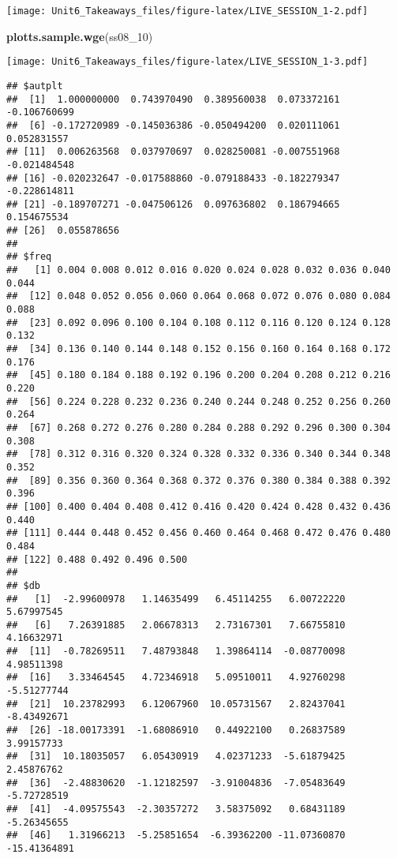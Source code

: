 \documentclass[]{article}
\newenvironment{Shaded}{\begin{snugshade}}{\end{snugshade}}
\newcommand{\DecValTok}[1]{\textcolor[rgb]{0.00,0.00,0.81}{#1}}
\newcommand{\KeywordTok}[1]{\textcolor[rgb]{0.13,0.29,0.53}{\textbf{#1}}}
\newcommand{\NormalTok}[1]{#1}
\begin{document}
\texttt{[image: Unit6\_Takeaways\_files/figure-latex/LIVE\_SESSION\_1-2.pdf]}

\begin{Shaded}
\begin{Highlighting}[]
\KeywordTok{plotts.sample.wge}\NormalTok{(ss08_}\DecValTok{10}\NormalTok{)}
\end{Highlighting}
\end{Shaded}

\texttt{[image: Unit6\_Takeaways\_files/figure-latex/LIVE\_SESSION\_1-3.pdf]}

\begin{verbatim}
## $autplt
##  [1]  1.000000000  0.743970490  0.389560038  0.073372161 -0.106760699
##  [6] -0.172720989 -0.145036386 -0.050494200  0.020111061  0.052831557
## [11]  0.006263568  0.037970697  0.028250081 -0.007551968 -0.021484548
## [16] -0.020232647 -0.017588860 -0.079188433 -0.182279347 -0.228614811
## [21] -0.189707271 -0.047506126  0.097636802  0.186794665  0.154675534
## [26]  0.055878656
## 
## $freq
##   [1] 0.004 0.008 0.012 0.016 0.020 0.024 0.028 0.032 0.036 0.040 0.044
##  [12] 0.048 0.052 0.056 0.060 0.064 0.068 0.072 0.076 0.080 0.084 0.088
##  [23] 0.092 0.096 0.100 0.104 0.108 0.112 0.116 0.120 0.124 0.128 0.132
##  [34] 0.136 0.140 0.144 0.148 0.152 0.156 0.160 0.164 0.168 0.172 0.176
##  [45] 0.180 0.184 0.188 0.192 0.196 0.200 0.204 0.208 0.212 0.216 0.220
##  [56] 0.224 0.228 0.232 0.236 0.240 0.244 0.248 0.252 0.256 0.260 0.264
##  [67] 0.268 0.272 0.276 0.280 0.284 0.288 0.292 0.296 0.300 0.304 0.308
##  [78] 0.312 0.316 0.320 0.324 0.328 0.332 0.336 0.340 0.344 0.348 0.352
##  [89] 0.356 0.360 0.364 0.368 0.372 0.376 0.380 0.384 0.388 0.392 0.396
## [100] 0.400 0.404 0.408 0.412 0.416 0.420 0.424 0.428 0.432 0.436 0.440
## [111] 0.444 0.448 0.452 0.456 0.460 0.464 0.468 0.472 0.476 0.480 0.484
## [122] 0.488 0.492 0.496 0.500
## 
## $db
##   [1]  -2.99600978   1.14635499   6.45114255   6.00722220   5.67997545
##   [6]   7.26391885   2.06678313   2.73167301   7.66755810   4.16632971
##  [11]  -0.78269511   7.48793848   1.39864114  -0.08770098   4.98511398
##  [16]   3.33464545   4.72346918   5.09510011   4.92760298  -5.51277744
##  [21]  10.23782993   6.12067960  10.05731567   2.82437041  -8.43492671
##  [26] -18.00173391  -1.68086910   0.44922100   0.26837589   3.99157733
##  [31]  10.18035057   6.05430919   4.02371233  -5.61879425   2.45876762
##  [36]  -2.48830620  -1.12182597  -3.91004836  -7.05483649  -5.72728519
##  [41]  -4.09575543  -2.30357272   3.58375092   0.68431189  -5.26345655
##  [46]   1.31966213  -5.25851654  -6.39362200 -11.07360870 -15.41364891

\end{verbatim}
\end{document}
